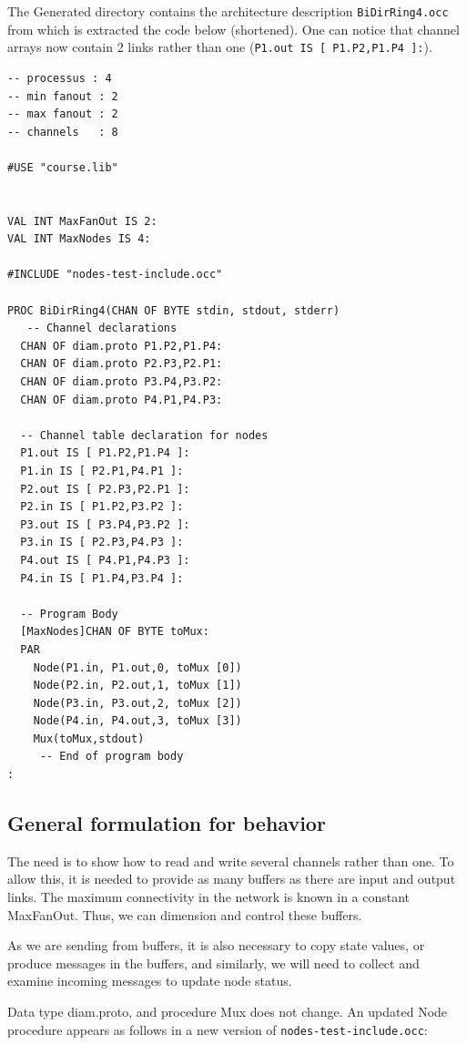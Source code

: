 \documentclass[times,a4paper]{book}
\begin{document}
The Generated directory contains the architecture description {\tt BiDirRing4.occ} from which is extracted
the code below (shortened). One can notice that channel arrays now contain 2 links rather than one
({\tt   P1.out IS [ P1.P2,P1.P4 ]:}).

\begin{lstlisting} 
-- processus : 4
-- min fanout : 2
-- max fanout : 2
-- channels   : 8
 
#USE "course.lib"


VAL INT MaxFanOut IS 2:
VAL INT MaxNodes IS 4:

#INCLUDE "nodes-test-include.occ"

PROC BiDirRing4(CHAN OF BYTE stdin, stdout, stderr)
   -- Channel declarations
  CHAN OF diam.proto P1.P2,P1.P4:
  CHAN OF diam.proto P2.P3,P2.P1:
  CHAN OF diam.proto P3.P4,P3.P2:
  CHAN OF diam.proto P4.P1,P4.P3:

  -- Channel table declaration for nodes
  P1.out IS [ P1.P2,P1.P4 ]:
  P1.in IS [ P2.P1,P4.P1 ]:
  P2.out IS [ P2.P3,P2.P1 ]:
  P2.in IS [ P1.P2,P3.P2 ]:
  P3.out IS [ P3.P4,P3.P2 ]:
  P3.in IS [ P2.P3,P4.P3 ]:
  P4.out IS [ P4.P1,P4.P3 ]:
  P4.in IS [ P1.P4,P3.P4 ]:

  -- Program Body
  [MaxNodes]CHAN OF BYTE toMux:
  PAR
    Node(P1.in, P1.out,0, toMux [0])
    Node(P2.in, P2.out,1, toMux [1])
    Node(P3.in, P3.out,2, toMux [2])
    Node(P4.in, P4.out,3, toMux [3])
    Mux(toMux,stdout)
     -- End of program body
:
\end{lstlisting} 

\subsection{General formulation for behavior}

The need is to show how to read and write several channels
rather than one. To allow this, it is needed to provide as many buffers
as there are input and output links. The maximum connectivity in
the network is known in a constant MaxFanOut. Thus, we can dimension and
control these buffers.

As we are sending from buffers, it is also necessary to copy state values,
or produce messages in the buffers, and similarly, we will need to collect
and examine incoming messages to update node status.

Data type diam.proto, and procedure Mux does not change.
An updated Node procedure appears as follows in a new version of {\tt nodes-test-include.occ}:
\end{document}
